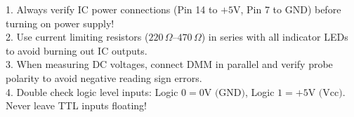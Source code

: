 \begin{examtip}
1. Always verify IC power connections (Pin 14 to $+5\text{V}$, Pin 7 to $\text{GND}$) before turning on power supply!\\
2. Use current limiting resistors ($220\,\Omega\text{--}470\,\Omega$) in series with all indicator LEDs to avoid burning out IC outputs.\\
3. When measuring DC voltages, connect DMM in parallel and verify probe polarity to avoid negative reading sign errors.\\
4. Double check logic level inputs: Logic $0 = 0\text{V (GND)}$, Logic $1 = +5\text{V (Vcc)}$. Never leave TTL inputs floating!
\end{examtip}
